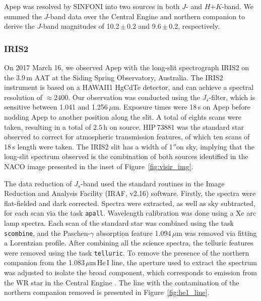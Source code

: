 \documentclass[preprint,times]{aastex61}
\begin{document}
Apep was resolved by SINFONI into two sources in both $J$- and $H$+$K$-band. We summed the $J$-band data over the Central Engine and northern companion to derive the $J$-band magnitudes of 10.2\,$\pm$\,0.2 and 9.6\,$\pm$\,0.2, respectively. 


\subsubsection{IRIS2}

On 2017 March 16, we observed Apep with the long-slit spectrograph IRIS2 \citep{2004SPIE.5492..998T} on the 3.9\,m AAT at the Siding Spring Observatory, Australia. The IRIS2 instrument is based on a HAWAII1 HgCdTe detector, and can achieve a spectral resolution of $ \approx 2400$. Our observation was conducted using the $J_{s}$-filter, which is sensitive between 1.041 and 1.256\,$\mu$m. Exposure times were 18\,s on Apep before nodding Apep to another position along the slit. A total of eights scans were taken, resulting in a total of $2.5$\,h on source. HIP\,73881 was the standard star observed to correct for atmospheric transmission features, of which ten scans of 18\,s length were taken. The IRIS2 slit has a width of 1$''$on sky, implying that the long-slit spectrum observed is the combination of both sources identified in the NACO image presented in the inset of Figure~\ref{fig:visir_img}. 

The data reduction of $J_{s}$-band used the standard routines in the Image Reduction and Analysis Facility (IRAF, v2.16) software. Firstly, the spectra were flat-fielded and dark corrected. Spectra were extracted, as well as sky subtracted, for each scan via the task {\tt apall}. Wavelength calibration was done using a Xe arc lamp spectra. Each scan of the standard star was combined using the task {\tt scombine}, and the Paschen-$\gamma$ absorption feature 1.094\,$\mu$m was removed via fitting a Lorentzian profile. After combining all the science spectra, the telluric features were removed using the task {\tt telluric}. To remove the presence of the northern companion from the 1.083\,$\mu$m\,He\,I line, the aperture used to extract the spectrum was adjusted to isolate the broad component, which corresponds to emission from the WR star in the Central Engine \citep{1994MNRAS.269.1082E}. The line with the contamination of the northern companion removed is presented in Figure~\ref{fig:he1_line}.
\end{document}

